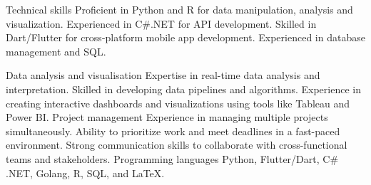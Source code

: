 \begin{cvskills}
  \cvskill
    {Technical skills} %
    {
    Proficient in Python and R for data manipulation, analysis and visualization.\newline
    Experienced in C\#.NET for API development.\newline
    Skilled in Dart/Flutter for cross-platform mobile app development.\newline
    Experienced in database management and SQL.
    }

    \cvskill
    {Data analysis and visualisation}
    {
        Expertise in real-time data analysis and interpretation.\newline
        Skilled in developing data pipelines and algorithms.\newline
        Experience in creating interactive dashboards and visualizations using tools like Tableau and Power BI.
    }
    \cvskill
    {Project management}
    {
        Experience in managing multiple projects simultaneously.\newline
        Ability to prioritize work and meet deadlines in a fast-paced environment.\newline
        Strong communication skills to collaborate with cross-functional teams and stakeholders.
    }
    \cvskill
    {Programming languages}
    {
        Python, Flutter/Dart, C\# .NET, Golang, R, SQL, and LaTeX. 
    }

\end{cvskills}





